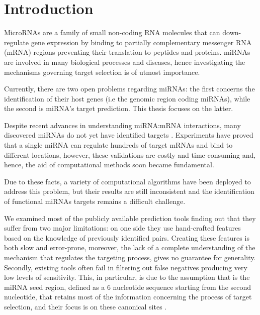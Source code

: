 
\chapter{Introduction} %

\label{Intro} %


\newcommand{\keyword}[1]{\textbf{#1}}
\newcommand{\tabhead}[1]{\textbf{#1}}
\newcommand{\code}[1]{\texttt{#1}}
\newcommand{\file}[1]{\texttt{\bfseries#1}}
\newcommand{\option}[1]{\texttt{\itshape#1}}

MicroRNAs are a family of small non-coding RNA molecules that can down-regulate gene expression by binding to partially complementary messenger RNA (mRNA) regions preventing their translation to peptides and proteins. miRNAs are involved in many biological processes and diseases, hence investigating the mechanisms governing target selection is of utmost importance. 

Currently, there are two open problems regarding miRNAs: the first concerns the identification of their host genes (i.e the genomic region coding miRNAs), while the second is miRNA's target prediction. This thesis focuses on the latter.

Despite recent advances in understanding miRNA:mRNA interactions, many discovered miRNAs do not yet have identified targets \cite{perfect_matching}. Experiments have proved that a single miRNA can regulate hundreds of target mRNAs and bind to different locations, however, these validations are costly and time-consuming and, hence, the aid of computational methods soon became fundamental.

Due to these facts, a variety of computational algorithms have been deployed to address this problem, but their results are still inconsistent and the identification of functional miRNAs targets remains a difficult challenge.

We examined most of the publicly available prediction tools finding out that they suffer from two major limitations: on one side they use hand-crafted features based on the knowledge of previously identified pairs. Creating these features is both slow and error-prone, moreover, the lack of a complete understanding of the mechanism that regulates the targeting process, gives no guarantee for generality. Secondly, existing tools often fail in filtering out false negatives producing very low levels of sensitivity. This, in particular, is due to the assumption that is the miRNA seed region, defined as a 6 nucleotide sequence starting from the second nucleotide, that retains most of the information concerning the process of target selection, and their focus is on these canonical sites \cite{canonical_target}.    

